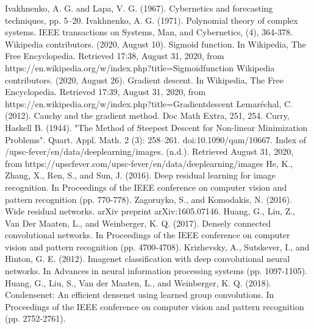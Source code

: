 \documentclass[conference]{IEEEtran}
\begin{document}
\begin{thebibliography}{99}

 Ivakhnenko, A. G. and Lapa, V. G. (1967). Cybernetics and forecasting techniques, pp. 5--20.
 Ivakhnenko, A. G. (1971). Polynomial theory of complex systems. IEEE transactions on Systems, Man, and Cybernetics, (4), 364-378.
 Wikipedia contributors. (2020, August 10). Sigmoid function. In Wikipedia, The Free Encyclopedia. Retrieved 17:38, August 31, 2020, from https://en.wikipedia.org/w/index.php?title=Sigmoidfunction
 Wikipedia contributors. (2020, August 26). Gradient descent. In Wikipedia, The Free Encyclopedia. Retrieved 17:39, August 31, 2020, from https://en.wikipedia.org/w/index.php?title=Gradientdescent
 Lemaréchal, C. (2012). Cauchy and the gradient method. Doc Math Extra, 251, 254.
 Curry, Haskell B. (1944). "The Method of Steepest Descent for Non-linear Minimization Problems". Quart. Appl. Math. 2 (3): 258–261. doi:10.1090/qam/10667.
 Index of /upsc-fever/en/data/deeplearning/images. (n.d.). Retrieved August 31, 2020, from https://upscfever.com/upsc-fever/en/data/deeplearning/images
 He, K., Zhang, X., Ren, S., and Sun, J. (2016). Deep residual learning for image recognition. In Proceedings of the IEEE conference on computer vision and pattern recognition (pp. 770-778).
 Zagoruyko, S., and Komodakis, N. (2016). Wide residual networks. arXiv preprint arXiv:1605.07146.
 Huang, G., Liu, Z., Van Der Maaten, L., and Weinberger, K. Q. (2017). Densely connected convolutional networks. In Proceedings of the IEEE conference on computer vision and pattern recognition (pp. 4700-4708).
 Krizhevsky, A., Sutskever, I., and Hinton, G. E. (2012). Imagenet classification with deep convolutional neural networks. In Advances in neural information processing systems (pp. 1097-1105).
 Huang, G., Liu, S., Van der Maaten, L., and Weinberger, K. Q. (2018). Condensenet: An efficient densenet using learned group convolutions. In Proceedings of the IEEE conference on computer vision and pattern recognition (pp. 2752-2761).

\end{thebibliography}
\end{document}
